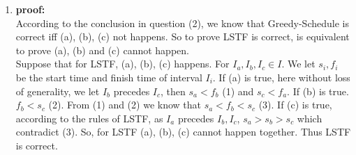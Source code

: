\begin{enumerate}
	\item \textbf{proof:} \\
	According to the conclusion in question (2), we know that Greedy-Schedule is correct iff (a), (b), (c) not happens. So to prove LSTF is correct, is equivalent to prove (a), (b) and (c) cannot happen. \\

	Suppose that for LSTF, (a), (b), (c) happens. For $I_a, I_b, I_c \in I$. We let $s_i, f_i$ be the start time and finish time of interval $I_i$. If (a) is true, here without loss of generality, we let $I_b$ precedes $I_c$,  then $s_a < f_b$ (1) and $ s_c < f_a $. If (b) is true. $f_b < s_c$ (2). From (1) and (2) we know that $s_a < f_b < s_c$ (3). If (c) is true, according to the rules of LSTF, as $I_a$ precedes $I_b, I_c$, $s_a > s_b > s_c$ which contradict (3). So, for LSTF (a), (b), (c) cannot happen together. Thus LSTF is correct. 
\end{enumerate}